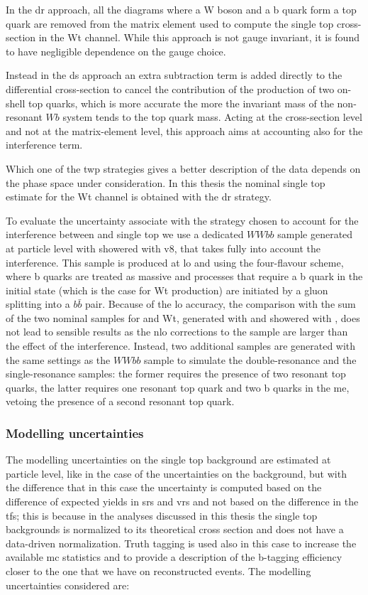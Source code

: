 In the \gls{dr} approach, all the diagrams where a W boson and a b quark form a top quark are removed from the matrix element used to compute the single top cross-section in the Wt channel. While this approach is not gauge invariant, it is found to have negligible dependence on the gauge choice.

Instead in the \gls{ds} approach an extra subtraction term is added directly to the differential cross-section to cancel the contribution of the 
production of two on-shell top quarks, which is more accurate the more the invariant mass of the non-resonant $Wb$ system tends to the top quark mass. 
Acting at the cross-section level and not at the matrix-element level, this approach aims at accounting also for the interference term. 

Which one of the twp strategies gives a better description of the data depends on the phase space under consideration. 
In this thesis the nominal single top estimate for the Wt channel is obtained with the \gls{dr} strategy.  

To evaluate the uncertainty associate with the strategy chosen to account for the interference between \ttbar and single top
we use a dedicated $WWbb$ sample generated at particle level with \aNLO showered with \PY v8, that takes fully into account the interference.
This sample is produced at \gls{lo} and using the four-flavour scheme, where b quarks are treated as massive and processes that require a b quark in the initial state (which is the case for Wt production) are initiated by a gluon splitting into a $b\bar{b}$ pair. 
Because of the \gls{lo} accuracy, the comparison with the sum of the two nominal samples for \ttbar and Wt, generated with \PowhegBox and showered with \PY, does not lead to sensible 
results as the \gls{nlo} corrections to the \ttbar sample are larger than the effect of the interference. 
Instead, two additional samples are generated with the same settings as the $WWbb$ sample to simulate the double-resonance and the single-resonance samples: the former requires the presence of two resonant top quarks, the latter requires one resonant top quark and two b quarks in the \gls{me}, vetoing the presence of a second resonant top quark.  


\subsubsection*{Modelling uncertainties}

The modelling uncertainties on the single top background are estimated at particle level, 
like in the case of the uncertainties on the \ttbar background, but with the difference that in this case the uncertainty is computed based on the difference of expected yields in \glspl{sr} and \glspl{vr} and not based on the difference in the \glspl{tf}; 
this is because in the analyses discussed in this thesis the single top backgrounds is normalized to its theoretical cross section and does not have a data-driven normalization. Truth tagging is used also in this case to increase the available \gls{mc} statistics and to provide a description of the b-tagging efficiency closer to the one that we have on reconstructed events. The modelling uncertainties considered are: 

